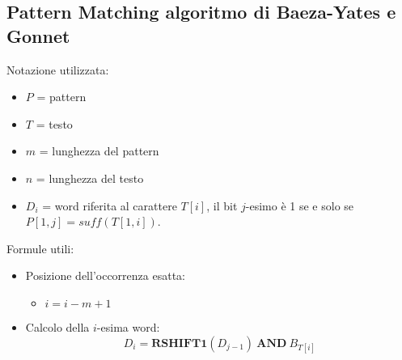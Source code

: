 \subsection{Pattern Matching algoritmo di Baeza-Yates e Gonnet}
Notazione utilizzata:
\begin{itemize}
    \item $P$ = pattern
    \item $T$ = testo
    \item $m$ = lunghezza del pattern
    \item $n$ = lunghezza del testo
    \item $D_i$ = word riferita al carattere $T[i]$, il bit $j$-esimo è 1 se e
          solo se $P[1, j] = suff(T[1, i])$.
\end{itemize}
Formule utili:
\begin{itemize}
    \item Posizione dell'occorrenza esatta:
          \begin{itemize}
              \item $i = i - m + 1$
          \end{itemize}
    \item Calcolo della $i$-esima word:
          \begin{equation}
              D_i = \textbf{RSHIFT1}(D_{j - 1}) \ \textbf{AND} \ B_{T[i]}
          \end{equation}
\end{itemize}
